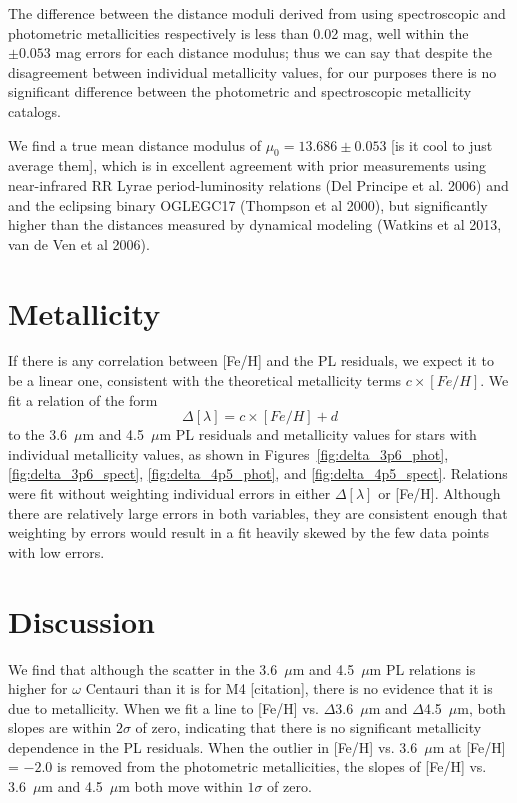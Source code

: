 \documentclass[a4paper,fleqn,usenatbib]{mnras}
\begin{document}
The difference between the distance moduli derived from using spectroscopic and photometric metallicities respectively is less than 0.02 mag, well within the $\pm 0.053$ mag errors for each distance modulus; thus we can say that despite the disagreement between individual metallicity values, for our purposes there is no significant difference between the photometric and spectroscopic metallicity catalogs.

We find a true mean distance modulus of $\mu_0 = 13.686 \pm 0.053$ [is it cool to just average them], which is in excellent agreement with prior measurements using near-infrared RR Lyrae period-luminosity relations (Del Principe et al. 2006) and and the eclipsing binary OGLEGC17 (Thompson et al 2000), but significantly higher than the distances measured by dynamical modeling (Watkins et al 2013, van de Ven et al 2006). 

\section{Metallicity}
\label{sec:metallicity}

If there is any correlation between [Fe/H] and the PL residuals, we expect it to be a linear one, consistent with the theoretical metallicity terms $c\times[Fe/H]$. We fit a relation of the form
\begin{equation}\Delta[\lambda] = c\times[Fe/H] + d\end{equation}
to the 3.6~$\mu$m and 4.5~$\mu$m PL residuals and metallicity values for stars with individual metallicity values, as shown in Figures~\ref{fig:delta_3p6_phot}, \ref{fig:delta_3p6_spect}, \ref{fig:delta_4p5_phot}, and \ref{fig:delta_4p5_spect}. Relations were fit without weighting individual errors in either $\Delta[\lambda]$ or [Fe/H]. Although there are relatively large errors in both variables, they are consistent enough that weighting by errors would result in a fit heavily skewed by the few data points with low errors.

\section{Discussion}
\label{sec:discussion}

We find that although the scatter in the 3.6~$\mu$m and 4.5~$\mu$m PL relations is higher for $\omega$ Centauri than it is for M4 [citation], there is no evidence that it is due to metallicity. When we fit a line to [Fe/H] vs. $\Delta$3.6~$\mu$m and $\Delta$4.5~$\mu$m, both slopes are within $2\sigma$ of zero, indicating that there is no significant metallicity dependence in the PL residuals. When the outlier in [Fe/H] vs. 3.6~$\mu$m at [Fe/H] = $-2.0$ is removed from the photometric metallicities, the slopes of [Fe/H] vs. 3.6~$\mu$m and 4.5~$\mu$m both move within $1\sigma$ of zero.
\end{document}
